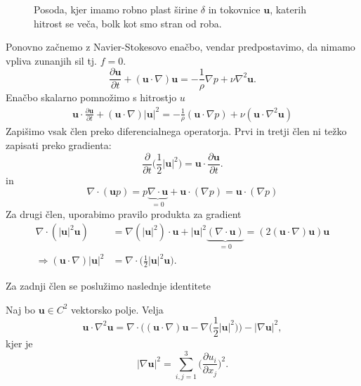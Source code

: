 \documentclass[mat2, tisk]{fmfdelo}
\newcommand{\bd}{\textbf}
\begin{document}
\begin{figure}[h!]
\caption{Posoda, kjer imamo robno plast širine $\delta$ in tokovnice $\bd{u}$, katerih hitrost se veča, bolk kot smo stran od roba.}
\end{figure}

Ponovno začnemo z Navier-Stokesovo enačbo, vendar predpostavimo, da nimamo vpliva zunanjih sil tj. $f = 0$.
$$
\frac{\partial \bd{u}}{\partial t} + (\bd{u}\cdot \nabla)\bd{u} = - \frac{1}{\rho}\nabla p + \nu \nabla^2 \bd{u}.
$$
Enačbo skalarno pomnožimo s hitrostjo $u$
\begin{align*}
\bd{u}\cdot\frac{\partial \bd{u}}{\partial t} + (\bd{u}\cdot \nabla)|\bd{u}|^2 = - \frac{1}{\rho}(\bd{u}\cdot\nabla p) + \nu (\bd{u}\cdot\nabla^2 \bd{u})
\end{align*}
Zapišimo vsak člen preko diferencialnega operatorja. Prvi in tretji člen ni težko zapisati preko gradienta:
$$
\frac{\partial}{\partial t} \Big(\frac{1}{2} \bd{|u|}^2 \Big) = \bd{u}\cdot \frac{\partial \bd{u}}{\partial t}.
$$
in
$$
\nabla \cdot (\bd{u}p) = p\underbrace{\nabla\cdot \bd{u}}_{=0} + \bd{u}\cdot (\nabla p) = \bd{u}\cdot (\nabla p)
$$
Za drugi člen, uporabimo pravilo produkta za gradient 
\begin{align*}
\nabla \cdot (|\bd{u}|^2 \bd{u}) &= \nabla(|\bd{u}|^2) \cdot \bd{u} + |\bd{u}|^2 \underbrace{(\nabla \cdot \bd{u})}_{= 0} =  (2(\bd{u}\cdot\nabla)\bd{u})\bd{u}\\[2mm]
\Longrightarrow (\bd{u}\cdot\nabla)|\bd{u}|^2 &= \nabla \cdot \Big(\frac{1}{2} |\bd{u}|^2 \bd{u}\Big).
\end{align*}

Za zadnji člen se poslužimo naslednje identitete
\begin{lema}
Naj bo $\bd{u} \in C^2$ vektorsko polje.
Velja
\begin{equation}
\bd{u}\cdot \nabla^2 \bd{u} = \nabla\cdot\Big((\bd{u}\cdot \nabla)\bd{u} - \nabla\Big(\frac{1}{2} |\bd{u}|^2\Big)\Big) - |\nabla \bd{u}|^2,
\end{equation}
kjer je 
\begin{equation}
\label{gradnorm}
  |\nabla \bd{u}|^2 = \sum_{i,j=1}^3 \Big(\frac{\partial u_i}{\partial x_j}\Big)^2.
\end{equation}
\end{lema}
\end{document}
